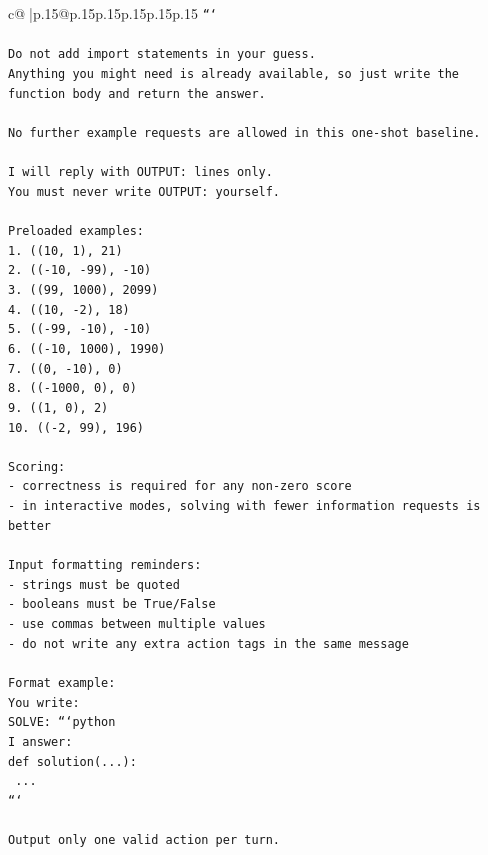\documentclass{article}
\begin{document}
{\begin{supertabular}{c@{$\;$}|p{.15\linewidth}@{}p{.15\linewidth}p{.15\linewidth}p{.15\linewidth}p{.15\linewidth}p{.15\linewidth}}
{{{\texttt{```} \\
\\ 
\texttt{Do not add import statements in your guess.} \\
\texttt{Anything you might need is already available, so just write the function body and return the answer.} \\
\\ 
\texttt{No further example requests are allowed in this one{-}shot baseline.} \\
\\ 
\texttt{I will reply with OUTPUT: lines only.} \\
\texttt{You must never write OUTPUT: yourself.} \\
\\ 
\texttt{Preloaded examples:} \\
\texttt{1. ((10, 1), 21)} \\
\texttt{2. (({-}10, {-}99), {-}10)} \\
\texttt{3. ((99, 1000), 2099)} \\
\texttt{4. ((10, {-}2), 18)} \\
\texttt{5. (({-}99, {-}10), {-}10)} \\
\texttt{6. (({-}10, 1000), 1990)} \\
\texttt{7. ((0, {-}10), 0)} \\
\texttt{8. (({-}1000, 0), 0)} \\
\texttt{9. ((1, 0), 2)} \\
\texttt{10. (({-}2, 99), 196)} \\
\\ 
\texttt{Scoring:} \\
\texttt{{-} correctness is required for any non{-}zero score} \\
\texttt{{-} in interactive modes, solving with fewer information requests is better} \\
\\ 
\texttt{Input formatting reminders:} \\
\texttt{{-} strings must be quoted} \\
\texttt{{-} booleans must be True/False} \\
\texttt{{-} use commas between multiple values} \\
\texttt{{-} do not write any extra action tags in the same message} \\
\\ 
\texttt{Format example:} \\
\texttt{You write:} \\
\texttt{SOLVE: ```python} \\
\texttt{I answer:} \\
\texttt{def solution(...):} \\
\texttt{    ...} \\
\texttt{```} \\
\\ 
\texttt{Output only one valid action per turn.} \\
            }
        }
    }
     \\ \\


\end{supertabular}}
\end{document}
